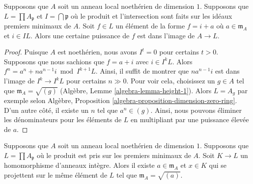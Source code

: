 \begin{lemma}
\label{lemma-power-works}
Supposons que $A$ soit un anneau local noethérien de dimension
$1$. Supposons que $L = \prod A_\mathfrak p$ et $I = \bigcap
\mathfrak p$ où le produit et l'intersection sont faits sur les
idéaux premiers minimaux de $A$. Soit $f \in L$ un élément de
la forme $f = i + a$ où $a \in \mathfrak m_A$ et $i \in IL$.
Alors une certaine puissance de $f$ est dans l'image de $A \to L$.
\end{lemma}

\begin{proof}
Puisque $A$ est noethérien, nous avons $I^t = 0$ pour certains
$t > 0$. Supposons que nous sachions que $f = a + i$ avec $i
\in I^kL$. Alors $f^n = a^n + na^{n - 1}i \bmod I^{k + 1}L$.
Ainsi, il suffit de montrer que $na^{n - 1}i$ est dans l'image
de $I^k \to I^kL$ pour certains $n \gg 0$. Pour voir cela,
choisissez un $g \in A$ tel que $\mathfrak m_A = \sqrt{(g)}$
(Algèbre, Lemme \ref{algebra-lemma-height-1}). Alors $L = A_g$
par exemple selon Algèbre, Proposition
\ref{algebra-proposition-dimension-zero-ring}. D'un autre côté, il existe
un $n$ tel que $a^n \in (g)$. Ainsi, nous pouvons éliminer les
dénominateurs pour les éléments de $L$ en multipliant par une puissance élevée de $a$.
\end{proof}

\begin{lemma}
\label{lemma-good-intersection}
Supposons que $A$ soit un anneau local noethérien de dimension $1$.
Supposons que $L = \prod A_\mathfrak p$ où le produit est pris sur les
premiers minimaux de $A$. Soit $K \to L$ un homomorphisme d'anneaux
intègre. Alors il existe $a \in \mathfrak m_A$ et $x \in K$ qui se
projettent sur le même élément de $L$ tel que $\mathfrak m_A = \sqrt{(a)}$.
\end{lemma}

